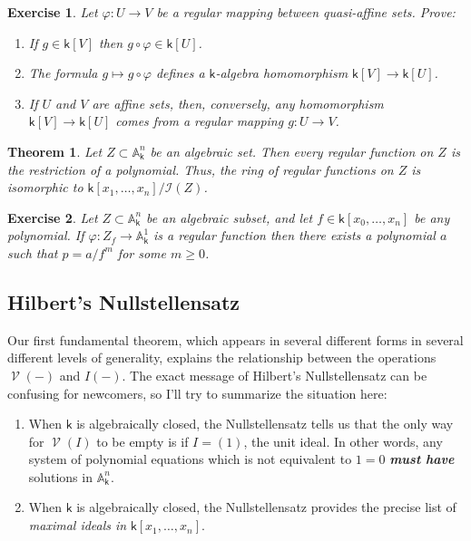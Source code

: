 \documentclass[11pt]{article}
\newcommand{\A}{\mathbb{A}}
\newcommand{\I}{\mathcal{I}}
\renewcommand{\k}{\mathsf{k}}
\renewcommand{\to}{\longrightarrow}
\DeclareMathOperator{\V}{\mathcal{V}}
\newcommand{\A}{\mathbb A}
\renewcommand{\k}{\mathsf{k}}
\renewcommand{\to}{{\longrightarrow}}
\newtheorem{theorem}{Theorem}[section]
\newtheorem{exercise}{Exercise}[section]
\begin{document}
\begin{exercise}
Let \(\varphi: U \to V\) be a regular mapping between quasi-affine sets.  Prove:
\begin{enumerate}
\item If \(g \in \k[V]\)  then \(g \circ \varphi \in \k[U]\).
\item The formula \(g \mapsto g \circ \varphi\) defines a \(\k\)-algebra homomorphism \(\k[V] \to \k[U]\).
\item If \(U\) and \(V\) are affine sets, then, conversely, any homomorphism \(\k[V] \to \k[U]\) comes from a regular mapping \(g: U \to V\).
\end{enumerate}
\end{exercise}


\begin{theorem}
Let \(Z \subset \A^n_{\k}\) be an algebraic set. Then every regular function on \(Z\) is the restriction of a polynomial.  Thus, the ring of regular functions on \(Z\) is isomorphic to \(\k[x_1, \dots, x_n]/\I(Z)\). 
\end{theorem}

\begin{exercise}
Let \(Z \subset \A^n_{\k}\) be an algebraic subset, and let \(f \in \k[x_0, \dots, x_n]\) be any polynomial.  If \(\varphi: Z_f \to \A^1_{\k}\) is a regular function then there exists a polynomial \(a\) such that \(p = a/f^{m}\) for some \(m \geq 0\). 
\end{exercise}

\subsection{Hilbert's Nullstellensatz}
\label{sec:orgdce084b}

Our first fundamental  theorem, which appears in several different forms in several different levels of generality, explains the relationship between the operations \(\V(-)\) and \(I(-)\).  The exact message of Hilbert's Nullstellensatz can be confusing for newcomers, so I'll try to summarize the situation here:

\begin{enumerate}
\item When \(\k\) is algebraically closed, the Nullstellensatz tells us that the only way for \(\V(I)\) to be empty is if \(I = (1)\), the unit ideal. In other words, any system of polynomial equations which is not equivalent to \(1=0\) \textbf{\emph{must have}} solutions in \(\A^n_{\k}\).
\item When \(\k\) is algebraically closed, the Nullstellensatz provides the precise list of \emph{maximal ideals in} \(\k[x_1, \dots, x_n]\).
\end{enumerate}
\end{document}
